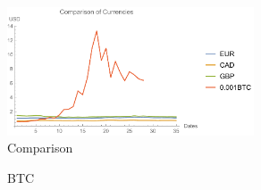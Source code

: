 \begin{figure}[!htb]
	\centering
	\includegraphics[width=0.65\textwidth]{figures/graph1.pdf}
	\caption{\label{fig:graph1}Comparison}
\end{figure}

\begin{figure}[ht]
	\centering
	\hfill
	\caption{BTC}
	\label{fig:Comparison}
\end{figure}

%	


